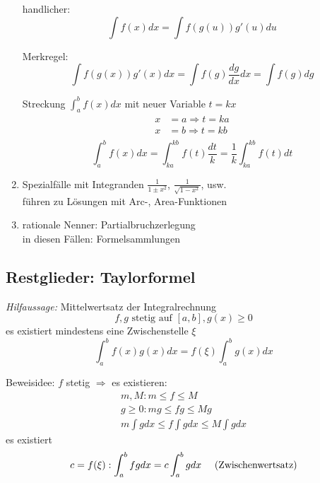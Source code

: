 \begin{enumerate}
		handlicher:
		\begin{equation*}
			\int f(x) dx = \int f(g(u)) g'(u) du
		\end{equation*}	
		
		Merkregel:
		\begin{equation*}
			\int f(g(x)) g'(x) dx = \int f(g) \frac{dg}{dx} dx = \int f(g) dg
		\end{equation*}
		
		\begin{example}
			Streckung $\int_a^b f(x) dx$ mit neuer Variable $t = k x$
			\begin{align*}
				x &= a \Rightarrow t = ka \\
				x &= b \Rightarrow t = kb \\
			\end{align*}
			\begin{equation*}
				\int_a^b f(x) dx = \int_{ka}^{kb} f(t) \frac{dt}{k} = \frac{1}{k} \int_{ka}^{kb} f(t) dt
			\end{equation*}
		\end{example}
		
	\item Spezialfälle mit Integranden $ \frac{1}{1\pm x^2}$, $\frac{1}{\sqrt{1-x^2}}$, usw. \\
		führen zu Lösungen mit Arc-, Area-Funktionen
		
	\item rationale Nenner: Partialbruchzerlegung \\
		in diesen Fällen: Formelsammlungen
\end{enumerate}
		
\subsection{Restglieder: Taylorformel}
\emph{Hilfaussage:} Mittelwertsatz der Integralrechnung
\begin{equation*}
	f, g \text{ stetig auf } [a, b], g(x) \geq 0
\end{equation*}
es existiert mindestens eine Zwischenstelle $\xi$
\begin{equation*}
	\int_a^b f(x) g(x) dx = f(\xi) \int_a^b g(x) dx
\end{equation*}

Beweisidee: $f$ stetig $\Rightarrow$ es existieren:
\begin{align*}
	m, M: m \leq f \leq M \\
	g \geq 0: mg \leq fg \leq Mg \\
	m \int g dx \leq f \int g dx \leq M \int g dx
\end{align*}
es existiert
\begin{equation*}
	c = f(\xi): \int_a^b fg dx = c \int_a^b g dx \text{\hspace{10px} (Zwischenwertsatz)}
\end{equation*}
	
